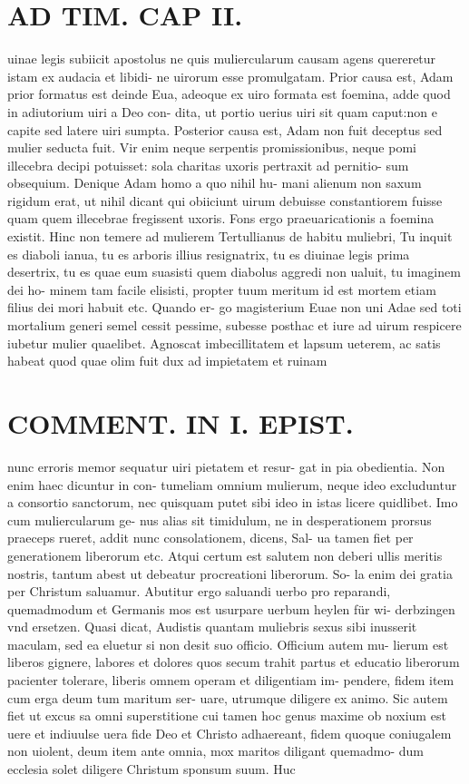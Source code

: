 \documentclass{article}
\begin{document}
\begin{pages}
\section*{AD TIM. CAP II. }
\marginpar{[ p.121 ]}\pstart uinae legis subiicit apostolus ne quis muliercularum causam agens quereretur istam ex audacia et libidi- ne uirorum esse promulgatam. Prior causa est, Adam prior formatus est deinde Eua, adeoque ex uiro formata est foemina, adde quod in adiutorium uiri a Deo con- dita, ut portio uerius uiri sit quam caput:non e capite sed latere uiri sumpta. Posterior causa est, Adam non fuit deceptus sed mulier seducta fuit. Vir enim neque serpentis promissionibus, neque pomi illecebra decipi potuisset: sola charitas uxoris pertraxit ad pernitio- sum obsequium. Denique Adam homo a quo nihil hu- mani alienum non saxum rigidum erat, ut nihil dicant qui obiiciunt uirum debuisse constantiorem fuisse quam quem illecebrae fregissent uxoris. Fons ergo praeuaricationis a foemina existit. Hinc non temere ad mulierem Tertullianus de habitu muliebri, Tu inquit es diaboli ianua, tu es arboris illius resignatrix, tu es diuinae legis prima desertrix, tu es quae eum suasisti quem diabolus aggredi non ualuit, tu imaginem dei ho- minem tam facile elisisti, propter tuum meritum id est mortem etiam filius dei mori habuit etc. Quando er- go magisterium Euae non uni Adae sed toti mortalium generi semel cessit pessime, subesse posthac et iure ad uirum respicere iubetur mulier quaelibet. Agnoscat imbecillitatem et lapsum ueterem, ac satis habeat quod quae olim fuit dux ad impietatem et ruinam  \pend
\section*{COMMENT. IN I. EPIST. }\pstart nunc erroris memor sequatur uiri pietatem et resur- gat in pia obedientia. Non enim haec dicuntur in con- tumeliam omnium mulierum, neque ideo excluduntur a consortio sanctorum, nec quisquam putet sibi ideo in istas licere quidlibet. Imo cum muliercularum ge- nus alias sit timidulum, ne in desperationem prorsus praeceps rueret, addit nunc consolationem, dicens, Sal- ua tamen fiet per generationem liberorum etc. Atqui certum est salutem non deberi ullis meritis nostris, tantum abest ut debeatur procreationi liberorum. So- la enim dei gratia per Christum saluamur. Abutitur ergo saluandi uerbo pro reparandi, quemadmodum et Germanis mos est usurpare uerbum heylen für wi- derbzingen vnd ersetzen. Quasi dicat, Audistis quantam muliebris sexus sibi inusserit maculam, sed ea eluetur si non desit suo officio. Officium autem mu- lierum est liberos gignere, labores et dolores quos secum trahit partus et educatio liberorum pacienter tolerare, liberis omnem operam et diligentiam im- pendere, fidem item cum erga deum tum maritum ser- uare, utrumque diligere ex animo. Sic autem fiet ut excus sa omni superstitione cui tamen hoc genus maxime ob noxium est uere et indiuulse uera fide Deo et Christo adhaereant, fidem quoque coniugalem non uiolent, deum item ante omnia, mox maritos diligant quemadmo- dum ecclesia solet diligere Christum sponsum suum. Huc  \pend

\end{pages}
\end{document}
